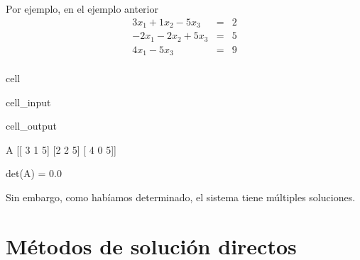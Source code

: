 \documentclass[letterpaper,10pt,english]{jupyterBook}
\begin{document}
\sphinxAtStartPar
Por ejemplo, en el ejemplo anterior
\begin{eqnarray*}
3x_1 + 1x_2 - 5x_3 &=& 2 \\
-2x_1 - 2x_2 + 5x_3 &=& 5 \\
4x_1 -5x_3  &=& 9 \\
\end{eqnarray*}
\begin{sphinxuseclass}{cell}\begin{sphinxVerbatimInput}

\begin{sphinxuseclass}{cell_input}
\begin{sphinxVerbatim}[commandchars=\\\{\}]
 
 
\end{sphinxVerbatim}

\end{sphinxuseclass}\end{sphinxVerbatimInput}
\begin{sphinxVerbatimOutput}

\begin{sphinxuseclass}{cell_output}
\begin{sphinxVerbatim}[commandchars=\\\{\}]
A
 [[ 3  1 \PYGZhy{}5]
 [\PYGZhy{}2 \PYGZhy{}2  5]
 [ 4  0 \PYGZhy{}5]]


det(A) =  0.0
\end{sphinxVerbatim}

\end{sphinxuseclass}\end{sphinxVerbatimOutput}

\end{sphinxuseclass}
\sphinxAtStartPar
Sin embargo, como habíamos determinado, el sistema tiene múltiples soluciones.


\section{Métodos de solución directos}
\label{\detokenize{1.2-Algebra_lineal/1.2-Algebra_lineal:metodos-de-solucion-directos}}
\end{document}

